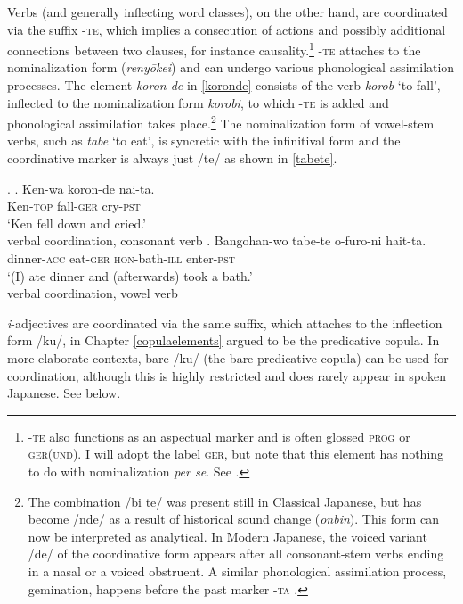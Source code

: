 \documentclass [output=book,colorlinks,citecolor=brown]{langscibook}
\begin{document}
Verbs (and generally inflecting word classes), on the other hand, are coordinated via the suffix -\textsc{te}, which implies a consecution of actions and possibly additional connections between two clauses, for instance causality.\footnote{-\textsc{te} also functions as an aspectual marker and is often glossed \textsc{prog} or \textsc{ger(und)}. I will adopt the label \textsc{ger}, but note that this element has nothing to do with nominalization \textit{per se}. See \citet{hasegawa:1996:study, mihara:2013:tekei, nakatani:2013:predicate, nakatani:2016:complex}.} -\textsc{te} attaches to the nominalization form (\textit{renyōkei}) and can undergo various phonological assimilation processes. The element \textit{koron-de} in \ref{koronde} consists of the verb \textit{korob} `to fall’, inflected to the nominalization form \textit{korobi}, to which -\textsc{te} is added and phonological assimilation takes place.\footnote{The combination /bi te/ was present still in Classical Japanese, but has become /nde/ as a result of historical sound change (\textit{onbin}). This form can now be interpreted as analytical. In Modern Japanese, the voiced variant /de/ of the coordinative form appears after all consonant-stem verbs ending in a nasal or a voiced obstruent. A similar phonological assimilation process, gemination, happens before the past marker -\textsc{ta} \citep{ito:2015:word}.} The nominalization form of vowel-stem verbs, such as \textit{tabe} `to eat’, is syncretic with the infinitival form and the coordinative marker is always just /te/ as shown in \ref{tabete}. %

\ex. \ag. Ken-wa koron-de nai-ta.\\
Ken-\textsc{top} fall-\textsc{ger} cry-\textsc{pst}\\
`Ken fell down and cried.’ \\ \null \hfill verbal coordination, consonant verb \citep[357]{hiraiwa:2012:mechanism} \label{koronde}
\bg. Bangohan-wo tabe-te o-furo-ni hait-ta.\\
dinner-\textsc{acc} eat-\textsc{ger} \textsc{hon}-bath-\textsc{ill} enter-\textsc{pst}\\
`(I) ate dinner and (afterwards) took a bath.' \\ \null \hfill verbal coordination, vowel verb \label{tabete}

\textit{i}-adjectives are coordinated via the same suffix, which attaches to the inflection form /ku/, in Chapter \ref{copulaelements} argued to be the predicative copula. In more elaborate contexts, bare /ku/ (the bare predicative copula) can be used for coordination, although this is highly restricted and does rarely appear in spoken Japanese. See below. %
\end{document}
